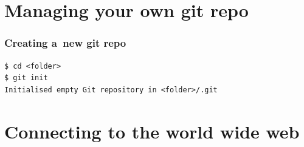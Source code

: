 \documentclass[12pt]{beamer}
\begin{document}
\section{Managing your own git repo}

\begin{frame}[fragile]
  \frametitle{Creating a~new git repo}

  {\footnotesize{}%
    \begin{verbatim}
$ cd <folder>
$ git init
Initialised empty Git repository in <folder>/.git
    \end{verbatim}%
  }
\end{frame}


\section{Connecting to the world wide web}




\end{document}
